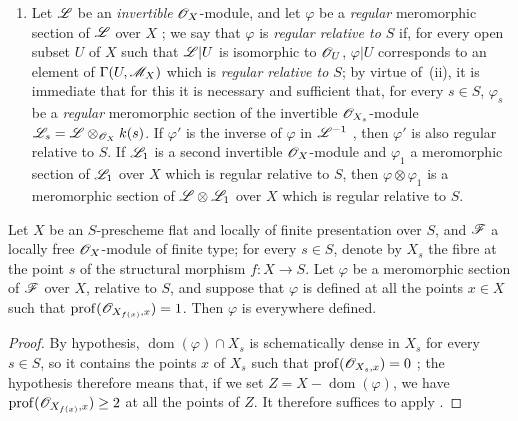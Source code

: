 \begin{remarks}[20.6.5]
\begin{enumerate}[label=(\roman*)]
  \item Let $\mathscr{L}$ be an \emph{invertible} $\mathscr{O}_X$-module, and let $\varphi$ be a \emph{regular} meromorphic section of $\mathscr{L}$ over $X$ ; we say that $\varphi$ is \emph{regular relative to $S$} if, for every open subset $U$ of $X$ such that $\mathscr{L}|U$ is isomorphic to $\mathscr{O}_U$, $\varphi|U$ corresponds to an element of $\Gamma(U,\mathscr{M}_X)$ which is \emph{regular relative to $S$}; by virtue of~(ii), it is immediate that for this it is necessary and sufficient that, for every $s\in S$, $\varphi_s$ be a \emph{regular} meromorphic section  of the invertible $\mathscr{O}_{X_s}$-module $\mathscr{L}_s=\mathscr{L}\otimes_{\mathscr{O}_X}k(s)$.
  If $\varphi'$ is the inverse of $\varphi$ in $\mathscr{L}^{-1}$ , then $\varphi'$ is also regular relative to $S$.
  If $\mathscr{L}_1$ is a second invertible $\mathscr{O}_X$-module and $\varphi_1$ a meromorphic section of $\mathscr{L}_1$ over $X$ which is regular relative to $S$, then $\varphi\otimes\varphi_1$ is a meromorphic section of $\mathscr{L}\otimes\mathscr{L}_1$ over $X$ which is regular relative to $S$.
\end{enumerate}
\end{remarks}

\begin{proposition}[20.6.6]
\label{IV.20.6.6}
Let $X$ be an $S$-prescheme flat and locally of finite presentation over $S$, and $\mathscr{F}$ a locally free $\mathscr{O}_X$-module of finite type; for every $s\in S$, denote by $X_s$ the fibre at the point $s$ of the structural morphism $f:X\to S$.
Let $\varphi$ be a meromorphic section of $\mathscr{F}$ over $X$, relative to $S$, and suppose that $\varphi$ is defined at all the points $x\in X$ such that $\operatorname{prof}(\mathscr{O}_{X_{f(x)},x})=1$.
Then $\varphi$ is everywhere defined.
\end{proposition}

\begin{proof}
By hypothesis, $\operatorname{dom}(\varphi)\cap X_s$ is schematically dense in $X_s$ for every $s\in S$, so it contains the points $x$ of $X_s$ such that $\operatorname{prof}(\mathscr{O}_{X_s,x})=0$ ; the hypothesis therefore means that, if we set $Z=X-\operatorname{dom}(\varphi)$, we have $\operatorname{prof}(\mathscr{O}_{X_{f(x)},x})\geq2$ at all the points of $Z$.
It therefore suffices to apply .
\end{proof}

